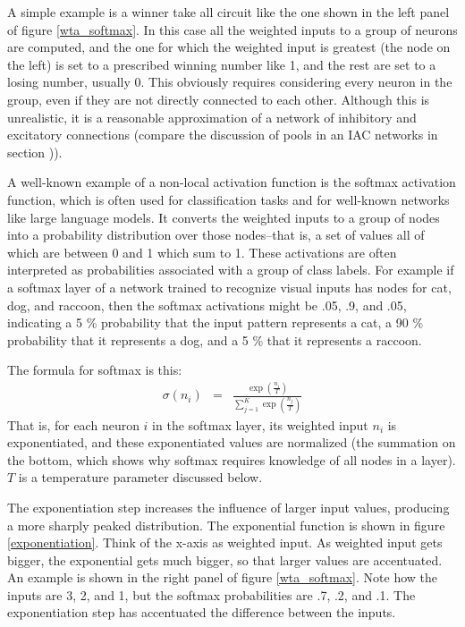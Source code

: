 A simple example is a winner take all circuit like the one shown in the left panel of figure \ref{wta_softmax}. In this case all the weighted inputs to a group of neurons are computed, and the one for which the weighted input is greatest (the node on the left) is set to a prescribed winning number like 1, and the rest are set to a losing number, usually 0. This obviously requires considering every neuron in the group, even if they are not directly connected to each other.  Although this is unrealistic, it is a reasonable approximation of a network of inhibitory and excitatory connections  (compare the discussion of pools in an IAC networks in section )).

A well-known example of a non-local activation function is the softmax activation function, which is often used for classification tasks and for well-known networks like large language models. It converts the weighted inputs to a group of nodes into a probability distribution over those nodes--that is, a set of values all of which are between 0 and 1 which sum to 1.   These activations are often interpreted as probabilities associated with a group of class labels. For example if a softmax layer of a network trained to recognize visual inputs has nodes for cat, dog, and raccoon, then the softmax activations might be .05, .9, and .05, indicating a 5 \% probability that the input pattern represents a cat, a 90 \% probability that it represents a dog, and a 5 \% that it represents a raccoon.

The formula for softmax is this:
\begin{eqnarray}
\sigma(n_i) &=& \frac{\exp\left(\frac{n_i}{T}\right)}{\sum_{j=1}^{K} \exp\left(\frac{n_j}{T}\right)}
\end{eqnarray}
That is, for each neuron $i$ in the softmax layer, its weighted input $n_i$ is exponentiated, and these exponentiated values are normalized (the summation on the bottom, which shows why softmax requires knowledge of all nodes in a layer). $T$ is a temperature parameter discussed below. 

The exponentiation step increases the influence of larger input values, producing a more sharply peaked distribution. The exponential function is shown in figure \ref{exponentiation}. Think of the x-axis as weighted input. As weighted input gets bigger, the exponential gets much bigger, so that larger values are accentuated. An example is shown in the right panel of figure \ref{wta_softmax}. Note how the inputs are 3, 2, and 1, but the softmax probabilities are .7, .2, and .1. The exponentiation step has accentuated the difference between the inputs.

